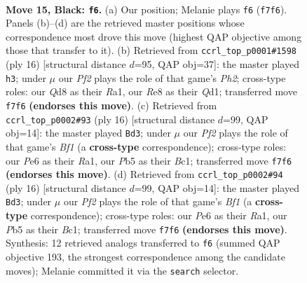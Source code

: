 \documentclass[11pt]{article}
\begin{document}
\begin{figure}[p]
\label{fig:thought-m27}
\end{figure}

\clearpage

\begin{figure}[p]\centering
\begin{subfigure}{0.46\textwidth}\centering
\resizebox{\linewidth}{!}{%
\newchessgame
\chessboard[
  setfen={rnbqr1k1/p3bp1p/2p1p1p1/1p1n4/3P4/1P1Q1BP1/P2NPPKP/RNB2R2 b - - 2 15},
  showmover=false,
  pgfstyle=straightmove, color=movearrow, markmove={f7-f6}
]}
\caption{}
\end{subfigure}\hfill
\begin{subfigure}{0.46\textwidth}\centering
\resizebox{\linewidth}{!}{%
\newchessgame
\chessboard[
  setfen={r1bq1rk1/ppp1npbp/2np2p1/8/2PNP3/2N1B1P1/PP3P1P/R2QKB1R w KQ - 3 9},
  showmover=false,
  pgfstyle=straightmove, color=movearrow, markmove={h2-h3}
]}
\caption{}
\end{subfigure}
\\[4pt]
\begin{subfigure}{0.46\textwidth}\centering
\resizebox{\linewidth}{!}{%
\newchessgame
\chessboard[
  setfen={r1b2rk1/ppqpbppp/2n1pn2/8/2P1P3/P1N2N2/1P3PPP/R1BQKB1R w KQ - 3 9},
  showmover=false,
  pgfstyle=straightmove, color=movearrow, markmove={f1-d3}
]}
\caption{}
\end{subfigure}\hfill
\begin{subfigure}{0.46\textwidth}\centering
\resizebox{\linewidth}{!}{%
\newchessgame
\chessboard[
  setfen={r1b2rk1/ppqpbppp/2n1pn2/8/2P1P3/P1N2N2/1P3PPP/R1BQKB1R w KQ - 3 9},
  showmover=false,
  pgfstyle=straightmove, color=movearrow, markmove={f1-d3}
]}
\caption{}
\end{subfigure}
\caption{\textbf{Move 15, Black: \texttt{f6}.} (a) Our position; Melanie plays \texttt{f6} (\texttt{f7f6}). Panels (b)--(d) are the retrieved master positions whose correspondence most drove this move (highest QAP objective among those that transfer to it). (b) Retrieved from \texttt{ccrl\_top\_p0001\#1598} (ply 16) [structural distance $d$=95, QAP obj=37]: the master played \texttt{h3}; under $\mu$ our \emph{Pf2} plays the role of that game's \emph{Ph2}; cross-type roles: our \emph{Q}d8 as their \emph{R}a1, our \emph{R}e8 as their \emph{Q}d1; transferred move \texttt{f7f6} \textbf{(endorses this move)}. (c) Retrieved from \texttt{ccrl\_top\_p0002\#93} (ply 16) [structural distance $d$=99, QAP obj=14]: the master played \texttt{Bd3}; under $\mu$ our \emph{Pf2} plays the role of that game's \emph{Bf1} (a \textbf{cross-type} correspondence); cross-type roles: our \emph{P}e6 as their \emph{R}a1, our \emph{P}b5 as their \emph{B}c1; transferred move \texttt{f7f6} \textbf{(endorses this move)}. (d) Retrieved from \texttt{ccrl\_top\_p0002\#94} (ply 16) [structural distance $d$=99, QAP obj=14]: the master played \texttt{Bd3}; under $\mu$ our \emph{Pf2} plays the role of that game's \emph{Bf1} (a \textbf{cross-type} correspondence); cross-type roles: our \emph{P}e6 as their \emph{R}a1, our \emph{P}b5 as their \emph{B}c1; transferred move \texttt{f7f6} \textbf{(endorses this move)}. Synthesis: 12 retrieved analogs transferred to \texttt{f6} (summed QAP objective 193, the strongest correspondence among the candidate moves); Melanie committed it via the \texttt{search} selector.}

\end{figure}
\end{document}

